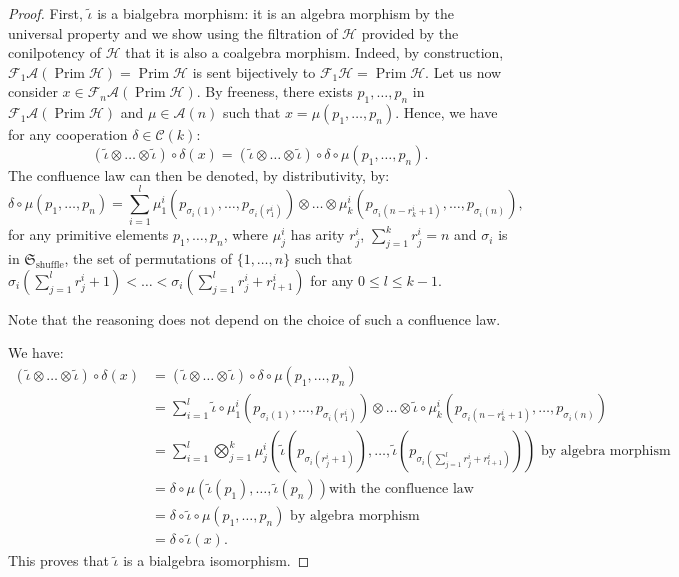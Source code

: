 \documentclass[11pt,leqno]{amsart}
\theoremstyle{definition}
\theoremstyle{plain}
\DeclareMathOperator{\prim}{Prim}
\newcommand{\Hc}{ \mathcal{H} }
\newcommand{\A}{ \mathcal{A} }
\newcommand{\C}{ \mathcal{C} }
\newcommand{\F}{ \mathcal{F} }
\begin{document}
\begin{proof}
First, $\tilde\iota$ is a bialgebra morphism: it is an algebra morphism by the universal property and we show using the filtration of $\mathcal H$ provided by the conilpotency of $\mathcal H$ that it is also a coalgebra morphism. Indeed, by construction, $\F_1 \A(\prim \Hc) = \prim \Hc$ is sent bijectively to $\F_1 \Hc=\prim \Hc$. Let us now consider $x\in \F_{n} \A(\prim \Hc)$. By freeness, there exists $p_1, \ldots, p_n$ in $\F_1 \A(\prim \Hc)$ and $\mu \in \A(n)$ such that $x = \mu(p_1, \ldots, p_n)$. Hence, we have for any cooperation $\delta \in \C(k)$:
\begin{equation*}
(\tilde{\iota} \otimes \ldots \otimes \tilde{\iota}) \circ \delta(x) = (\tilde{\iota} \otimes \ldots \otimes \tilde{\iota}) \circ \delta \circ \mu (p_1, \ldots, p_n).
\end{equation*}
The confluence law can then be denoted, by distributivity, by: 
\begin{equation*}
\delta \circ \mu (p_1, \ldots, p_n)= \sum_{i=1}^l \mu^i_1 \left(p_{\sigma_i(1)}, \ldots, p_{\sigma_i(r^i_1)} \right) \otimes \ldots \otimes \mu^i_k  \left(p_{\sigma_i(n-r^i_k+1)}, \ldots, p_{\sigma_i(n)}\right),
\end{equation*}
for any primitive elements $p_1, \ldots, p_n$, where $\mu^i_j$ has arity $r^i_j$, $\sum_{j=1}^k r^i_j=n$ and  $\sigma_i$ is in $\mathfrak{S}_{\textrm{shuffle}}$, the set of permutations of $\{1, \ldots, n\}$ such that $\sigma_i(\sum_{j=1}^l r^i_j+1)< \ldots < \sigma_i(\sum_{j=1}^l r^i_j+r^i_{l+1})$ for any $0 \leq l \leq k-1$.

Note that the reasoning does not depend on the choice of such a confluence law.


We have:
\begin{align*}
(\tilde{\iota} \otimes \ldots \otimes \tilde{\iota}) \circ \delta(x) &= (\tilde{\iota} \otimes \ldots \otimes \tilde{\iota}) \circ \delta \circ \mu (p_1, \ldots, p_n) \\
 &=  \sum_{i=1}^l \tilde{\iota} \circ \mu^i_1 \left(p_{\sigma_i(1)}, \ldots, p_{\sigma_i(r^i_1)} \right) \otimes \ldots \otimes \tilde{\iota} \circ \mu^i_k  \left(p_{\sigma_i(n-r^i_k+1)}, \ldots, p_{\sigma_i(n)}\right) \\
 &= \sum_{i=1}^l \bigotimes_{j=1}^k \mu^i_j \left(\tilde{\iota}(p_{\sigma_i(r^i_j+1)}), \ldots, \tilde{\iota}(p_{\sigma_i(\sum_{j=1}^l r^i_j+r^i_{l+1})}) \right)  \text{ by algebra morphism} \\
 &= \delta \circ \mu (\tilde{\iota}(p_1), \ldots, \tilde{\iota}(p_n)) \text{with the confluence law} \\
 &= \delta \circ \tilde{\iota} \circ \mu (p_1, \ldots, p_n) \text{ by algebra morphism} \\
 &= \delta \circ \tilde{\iota}(x).
\end{align*}
This proves that $\tilde{\iota}$ is a bialgebra isomorphism.


\end{proof}
\end{document}
